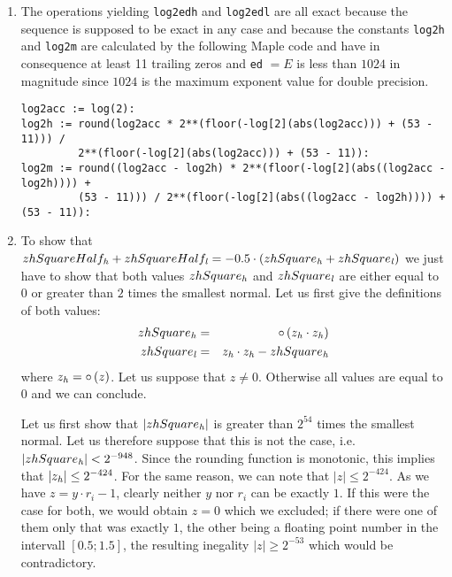 \begin{enumerate}
\item The operations yielding {\tt log2edh} and {\tt log2edl} are all exact because the \Add~ sequence is supposed 
to be exact in any case and because the constants {\tt log2h} and {\tt log2m} are calculated by the following Maple
code and have in consequence at least 11 trailing zeros and {\tt ed} $=E$ is less than $1024$ in magnitude since $1024$ is
the maximum exponent value for double precision. 
\begin{lstlisting}[caption={Maple code for computing {\tt log2h} and {\tt log2m}},firstnumber=21,label={list:maplelog2}]
log2acc := log(2):
log2h := round(log2acc * 2**(floor(-log[2](abs(log2acc))) + (53 - 11))) / 
         2**(floor(-log[2](abs(log2acc))) + (53 - 11)):
log2m := round((log2acc - log2h) * 2**(floor(-log[2](abs((log2acc - log2h)))) + 
         (53 - 11))) / 2**(floor(-log[2](abs((log2acc - log2h)))) + (53 - 11)):
\end{lstlisting}
\item To show that $zhSquareHalf_{\mathit{h}} + zhSquareHalf_{\mathit{l}} = -0.5 \cdot \left( zhSquare_{\mathit{h}} + zhSquare_{\mathit{l}} \right)$ we just have to show
that both values $zhSquare_{\mathit{h}}$ and $zhSquare_{\mathit{l}}$ are either equal to $0$ or greater than $2$ times the smallest
normal. Let us first give the definitions of both values:
\begin{eqnarray*}
zhSquare_{\mathit{h}} & = & \circ \left( z_{\mathit{h}} \cdot z_{\mathit{h}} \right) \\
zhSquare_{\mathit{l}} & = & z_{\mathit{h}} \cdot z_{\mathit{h}} - zhSquare_{\mathit{h}} 
\end{eqnarray*}
where $z_{\mathit{h}} = \circ \left( z \right)$.
Let us suppose that $z \not = 0$. Otherwise all values are equal to $0$ and we can conclude.

Let us first show that $\left \vert zhSquare_{\mathit{h}} \right \vert$ is greater than $2^{54}$ times the smallest normal. 
Let us therefore suppose that this
is not the case, i.e. $\left \vert zhSquare_{\mathit{h}} \right \vert < 2^{-948}$. Since the rounding function is monotonic,
this implies that $\left \vert z_{\mathit{h}} \right \vert \leq 2^{-424}$. For the same reason, we can note that 
$\left \vert z \right \vert \leq 2^{-424}$. As we have $z = y \cdot r_i - 1$, clearly neither $y$ nor $r_i$ can be exactly $1$. 
If this were the case for both, we would obtain $z=0$ which we excluded; if there were one of them only that was
exactly $1$, the other being a floating point number in the intervall $\left[ 0.5; 1.5 \right]$, 
the resulting inegality $\left \vert z \right \vert \geq 2^{-53}$ which would be contradictory.


\end{enumerate}
